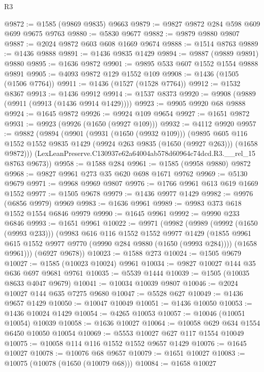 \begin{lexlean}{R3}
\begin{coremodule}
@9872 := @1585 (@9869 @9835) @9663
@9879 := @9827 @9872 @284 @598 @609 @699 @9675 @9763
@9880 := @5830 @9677
@9882 := @9879 @9880 @9807
@9887 := @2024 @9872 @603 @608 @1669 @9674
@9888 := @1514 @8763
@9889 := @1436 @9888
@9891 := @1436 @9835 @1429
@9894 := @9887 (@9889 @9891) @9880
@9895 := @1636 @9872
@9901 := @9895 @533 @607 @1552 @1554 @9888 @9891
@9905 := @4093 @9872 @129 @1552 @109
@9908 := @1436 (@1505 (@1506 @7764))
@9911 := @1436 (@1527 (@1528 @7764))
@9912 := @1532 @8367
@9913 := @1436 @9912
@9914 := @1537 @8373
@9920 := @9908 (@9889 (@9911 (@9913 (@1436 @9914 @1429))))
@9923 := @9905 @9920 @68 @9888
@9924 := @1645 @9872
@9926 := @9924 @109 @9654
@9927 := @1651 @9872
@9931 := @9923 (@9926 (@1650 (@9927 @109)))
@9932 := @4112 @9920
@9957 := @9882
    (@9894
      (@9901
        (@9931 (@1650 (@9932 @109)))
        (@9895
          @605
          @116
          @1552
          @1552
          @9835
          @1429
          (@9924 @263 @9835 (@1650 (@9927 @263)))
          (@1658 @9872)))
      (LexLeanPreserve.C130937e62a64004ab578d60964c74dcd.R3.__rel_15 @8763 @9673))
@9958 := @1588 @284
@9961 := @1585 (@9958 @9880) @9872
@9968 := @9827 @9961 @273 @35 @620 @698 @1671 @9762
@9969 := @5130 @9679
@9971 := @9968 @9969 @9807
@9976 := @1766 @9961 @613 @619 @1669 @1552
@9977 := @1505 @9678
@9979 := @1436 @9977 @1429
@9982 := @9976 (@6856 @9979) @9969
@9983 := @1636 @9961
@9989 := @9983 @373 @618 @1552 @1554 @6846 @9979
@9990 := @1645 @9961
@9992 := @9990 @233 @6846
@9993 := @1651 @9961
@10022 := @9971
    (@9982
      (@9989
        (@9992 (@1650 (@9993 @233)))
        (@9983
          @616
          @116
          @1552
          @1552
          @9977
          @1429
          (@1855 @9961 @615 @1552 @9977 @9770 (@9990 @284 @9880 (@1650 (@9993 @284))))
          (@1658 @9961)))
      (@6927 @9678))
@10023 := @1588 @273
@10024 := @1505 @9679
@10027 := @1585 (@10023 @10024) @9961
@10034 := @9827 @10027 @144 @35 @636 @697 @9681 @9761
@10035 := @5539 @1444
@10039 := @1505 (@10035 @8633 @4047 @9679)
@10041 := @10034 @10039 @9807
@10046 := @2024 @10027 @144 @635 @7275 @9680
@10047 := @5528 @627
@10049 := @1436 @9657 @1429
@10050 := @10047 @10049
@10051 := @1436 @10050
@10053 := @1436 @10024 @1429
@10054 := @4265 @10053
@10057 := @10046 (@10051 @10054) @10039
@10058 := @1636 @10027
@10064 := @10058 @629 @634 @1554 @6450 @10050 @10054
@10069 := @5553 @10027 @627 @117 @1554 @10049
@10075 := @10058 @114 @116 @1552 @1552 @9657 @1429
@10076 := @1645 @10027
@10078 := @10076 @68 @9657
@10079 := @1651 @10027
@10083 := @10075 (@10078 (@1650 (@10079 @68)))
@10084 := @1658 @10027

\end{coremodule}
\end{lexlean}
